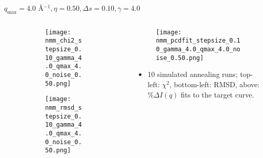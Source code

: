 \documentclass{beamer}
\begin{document}
\begin{frame}{$ q_{\textrm{max}}=4.0 $ \AA $^{-1}, \eta=0.50, \Delta s=0.10, \gamma=4.0$}
	\begin{columns}
		\begin{column}{.5\textwidth}
			\begin{figure}[H]
			\centering
			\begin{subfigure}[b]{\textwidth}
				\centering
				\texttt{[image: nmm\_chi2\_stepsize\_0.10\_gamma\_4.0\_qmax\_4.0\_noise\_0.50.png]}
				\label{fig:}
			\end{subfigure}
			\begin{subfigure}[b]{\textwidth}
				\centering
				\texttt{[image: nmm\_rmsd\_stepsize\_0.10\_gamma\_4.0\_qmax\_4.0\_noise\_0.50.png]}
				\label{fig:}
			\end{subfigure}
			\end{figure}
		\end{column}
		\begin{column}{.5\textwidth}
			\begin{figure}[H]
				\centering
				\texttt{[image: nmm\_pcdfit\_stepsize\_0.10\_gamma\_4.0\_qmax\_4.0\_noise\_0.50.png]}
				\label{fig:}
			\end{figure}
			\begin{itemize}
				\item 10 simulated annealing runs; top-left: $\chi^2$, bottom-left: RMSD, above: $\%\Delta I(q)$ fits to the target curve.
			\end{itemize}
		\end{column}
	\end{columns}
\end{frame}
 
\end{document}
